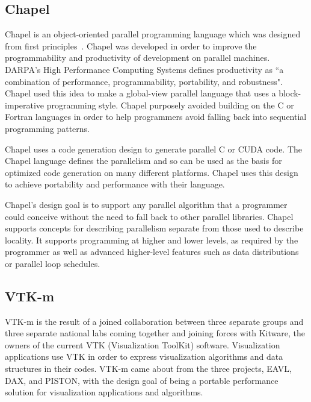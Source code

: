 \subsection*{\textbf{Chapel}}

Chapel is an object-oriented parallel programming language which was designed from first principles~\cite{sidelnik2012performance}.
%
Chapel was developed in order to improve the programmability and productivity of development on parallel machines.
%
DARPA's High Performance Computing Systems defines productivity as ``a combination of performance, programmability, portability, and robustness".
~\cite{chamberlain2007parallel}
%
Chapel used this idea to make a global-view parallel language that uses a block-imperative programming style.
%
Chapel purposely avoided building on the C or Fortran languages in order to help programmers avoid falling back into sequential programming patterns.
%
\cite{chamberlain2007parallel}

Chapel uses a code generation design to generate parallel C or CUDA code.
%
The Chapel language defines the parallelism and so can be used as the basis for optimized code generation on many different platforms.
%
Chapel uses this design to achieve portability and performance with their language.

Chapel's design goal is to support any parallel algorithm that a programmer could conceive without the need to fall back to other parallel libraries.
%
Chapel supports concepts for describing parallelism separate from those used to describe locality.
%
It supports programming at higher and lower levels, as required by the programmer as well as advanced higher-level features such as data distributions or parallel loop schedules.
%
~\cite{bradchamberlain2013}


\subsection*{\textbf{VTK-m}}

VTK-m is the result of a joined collaboration between three separate groups and three separate national labs coming together and joining forces with Kitware, the owners of the current VTK (Visualization ToolKit) software.
%
Visualization applications use VTK in order to express visualization algorithms and data structures in their codes.
%
VTK-m came about from the three projects, EAVL, DAX, and PISTON, with the design goal of being a portable performance solution for visualization applications and algorithms.
%

